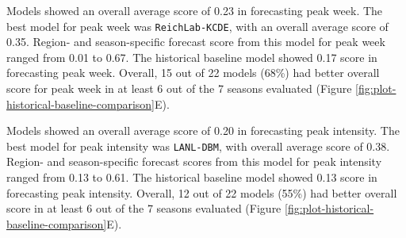 \documentclass{article}\usepackage[]{graphicx}\usepackage[]{color}
\begin{document}
Models showed an overall average score of 
0.23
in forecasting peak week. 
The best model for peak week was 
{\tt ReichLab-KCDE}, 
with an overall average score of 
0.35. 
Region- and season-specific forecast score from this model for peak week ranged from
0.01 to 
0.67.
The historical baseline model showed 
0.17 
score in forecasting peak week.
Overall, 15 out of 22 models (68\%) had better overall score for peak week in at least 6 out of the 7 seasons evaluated (Figure \ref{fig:plot-historical-baseline-comparison}E).

Models showed an overall average score of 
0.20
in forecasting peak intensity. 
The best model for peak intensity was 
{\tt LANL-DBM}, 
with overall average score of 
0.38. 
Region- and season-specific forecast scores from this model for peak intensity ranged from
0.13 to 
0.61.
The historical baseline model showed 
0.13 
score in forecasting peak intensity.
Overall, 12 out of 22 models (55\%) had better overall score in at least 6 out of the 7 seasons evaluated (Figure \ref{fig:plot-historical-baseline-comparison}E).

% 
% 
% 
\end{document}
